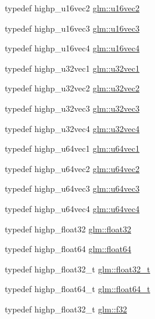\begin{DoxyCompactItemize}
\item 
typedef highp\+\_\+u16vec2 \hyperlink{group__gtc__type__precision_ga10e8900b9610f930772aa55aee8e3121}{glm\+::u16vec2}
\item 
typedef highp\+\_\+u16vec3 \hyperlink{group__gtc__type__precision_ga947d0d003e016eaf2038d6843b427257}{glm\+::u16vec3}
\item 
typedef highp\+\_\+u16vec4 \hyperlink{group__gtc__type__precision_ga87d1f39c523b4d6d4de0c2778afe5474}{glm\+::u16vec4}
\item 
typedef highp\+\_\+u32vec1 \hyperlink{group__gtc__type__precision_ga09dd72852808c32ba398674736b9672a}{glm\+::u32vec1}
\item 
typedef highp\+\_\+u32vec2 \hyperlink{group__gtc__type__precision_gad3a81c0d5a6941bb9ffdc9fa8611b426}{glm\+::u32vec2}
\item 
typedef highp\+\_\+u32vec3 \hyperlink{group__gtc__type__precision_ga16b26751ba6b83c8a0226b9834d73fdc}{glm\+::u32vec3}
\item 
typedef highp\+\_\+u32vec4 \hyperlink{group__gtc__type__precision_ga6e966cda0025699449a36b41f1787927}{glm\+::u32vec4}
\item 
typedef highp\+\_\+u64vec1 \hyperlink{group__gtc__type__precision_gaf0a59fdb715cf4ddf0c4dabf0e2286a9}{glm\+::u64vec1}
\item 
typedef highp\+\_\+u64vec2 \hyperlink{group__gtc__type__precision_gaddd85665767e5d32aee8516f00c45f59}{glm\+::u64vec2}
\item 
typedef highp\+\_\+u64vec3 \hyperlink{group__gtc__type__precision_ga7f104c29d70170cfb2223b29f7985bd4}{glm\+::u64vec3}
\item 
typedef highp\+\_\+u64vec4 \hyperlink{group__gtc__type__precision_gadafdefd5524bf6a48bb7c47edb787ae5}{glm\+::u64vec4}
\item 
typedef highp\+\_\+float32 \hyperlink{group__gtc__type__precision_ga814f2f65354b6588b067cc5c67a6b340}{glm\+::float32}
\item 
typedef highp\+\_\+float64 \hyperlink{group__gtc__type__precision_gab721f828b41f46b20cf4883b50733d3b}{glm\+::float64}
\item 
typedef highp\+\_\+float32\+\_\+t \hyperlink{group__gtc__type__precision_ga642737ae3e7c434b366f2191e6944bf2}{glm\+::float32\+\_\+t}
\item 
typedef highp\+\_\+float64\+\_\+t \hyperlink{group__gtc__type__precision_gade966a3eb25ebeb16dd53c40d3fdeb46}{glm\+::float64\+\_\+t}
\item 
typedef highp\+\_\+float32\+\_\+t \hyperlink{group__gtc__type__precision_ga0ec999b57f5330d9021256e96038df04}{glm\+::f32}

\end{DoxyCompactItemize}
